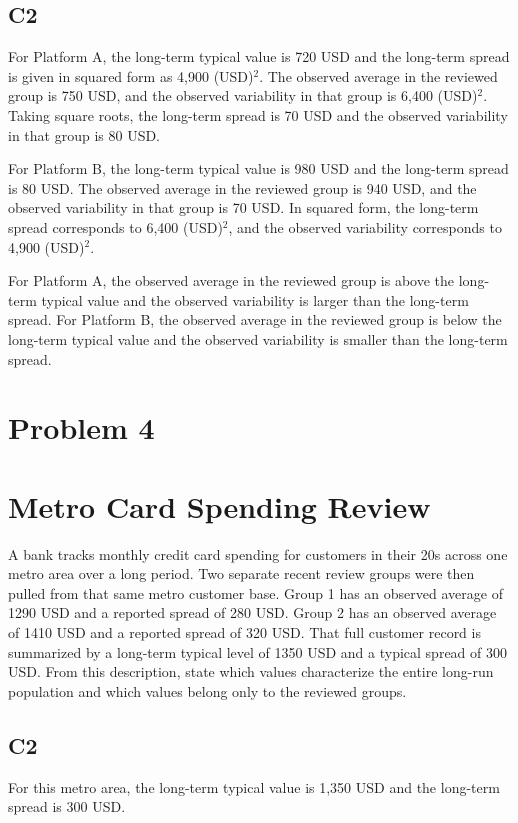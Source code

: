 \begin{ExamProblems}
\subsection*{C2}
		For Platform A, the long-term typical value is 720 USD and the long-term spread is given in squared form as 4,900 (USD)$^2$.
		The observed average in the reviewed group is 750 USD, and the observed variability in that group is 6,400 (USD)$^2$.
		Taking square roots, the long-term spread is 70 USD and the observed variability in that group is 80 USD.

		For Platform B, the long-term typical value is 980 USD and the long-term spread is 80 USD.
		The observed average in the reviewed group is 940 USD, and the observed variability in that group is 70 USD.
		In squared form, the long-term spread corresponds to 6,400 (USD)$^2$, and the observed variability corresponds to 4,900 (USD)$^2$.

		For Platform A, the observed average in the reviewed group is above the long-term typical value and the observed variability is larger than the long-term spread.
		For Platform B, the observed average in the reviewed group is below the long-term typical value and the observed variability is smaller than the long-term spread.


		\newpage
		\item
		\section{Problem 4}
		\section{Metro Card Spending Review}
		A bank tracks monthly credit card spending for customers in their 20s across one metro area over a long period.
		Two separate recent review groups were then pulled from that same metro customer base.
		Group 1 has an observed average of 1290 USD and a reported spread of 280 USD.
		Group 2 has an observed average of 1410 USD and a reported spread of 320 USD.
		That full customer record is summarized by a long-term typical level of 1350 USD and a typical spread of 300 USD.
		From this description, state which values characterize the entire long-run population and which values belong only to the reviewed groups.

\subsection*{C2}
		For this metro area, the long-term typical value is 1,350 USD and the long-term spread is 300 USD.


\end{ExamProblems}

